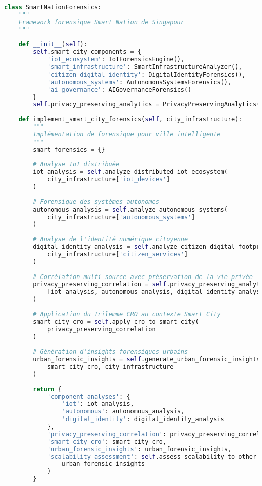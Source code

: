 \begin{lstlisting}[language=Python, caption=Framework Smart Nation pour forensique urbaine]
class SmartNationForensics:
    """
    Framework forensique Smart Nation de Singapour
    """
    
    def __init__(self):
        self.smart_city_components = {
            'iot_ecosystem': IoTForensicsEngine(),
            'smart_infrastructure': SmartInfrastructureAnalyzer(),
            'citizen_digital_identity': DigitalIdentityForensics(),
            'autonomous_systems': AutonomousSystemsForensics(),
            'ai_governance': AIGovernanceForensics()
        }
        self.privacy_preserving_analytics = PrivacyPreservingAnalytics()
        
    def implement_smart_city_forensics(self, city_infrastructure):
        """
        Implémentation de forensique pour ville intelligente
        """
        smart_forensics = {}
        
        # Analyse IoT distribuée
        iot_analysis = self.analyze_distributed_iot_ecosystem(
            city_infrastructure['iot_devices']
        )
        
        # Forensique des systèmes autonomes
        autonomous_analysis = self.analyze_autonomous_systems(
            city_infrastructure['autonomous_systems']
        )
        
        # Analyse de l'identité numérique citoyenne
        digital_identity_analysis = self.analyze_citizen_digital_footprint(
            city_infrastructure['citizen_services']
        )
        
        # Corrélation multi-source avec préservation de la vie privée
        privacy_preserving_correlation = self.privacy_preserving_analytics.correlate(
            [iot_analysis, autonomous_analysis, digital_identity_analysis]
        )
        
        # Application du Trilemme CRO au contexte Smart City
        smart_city_cro = self.apply_cro_to_smart_city(
            privacy_preserving_correlation
        )
        
        # Génération d'insights forensiques urbains
        urban_forensic_insights = self.generate_urban_forensic_insights(
            smart_city_cro, city_infrastructure
        )
        
        return {
            'component_analyses': {
                'iot': iot_analysis,
                'autonomous': autonomous_analysis,
                'digital_identity': digital_identity_analysis
            },
            'privacy_preserving_correlation': privacy_preserving_correlation,
            'smart_city_cro': smart_city_cro,
            'urban_forensic_insights': urban_forensic_insights,
            'scalability_assessment': self.assess_scalability_to_other_cities(
                urban_forensic_insights
            )
        }
    

\end{lstlisting}
